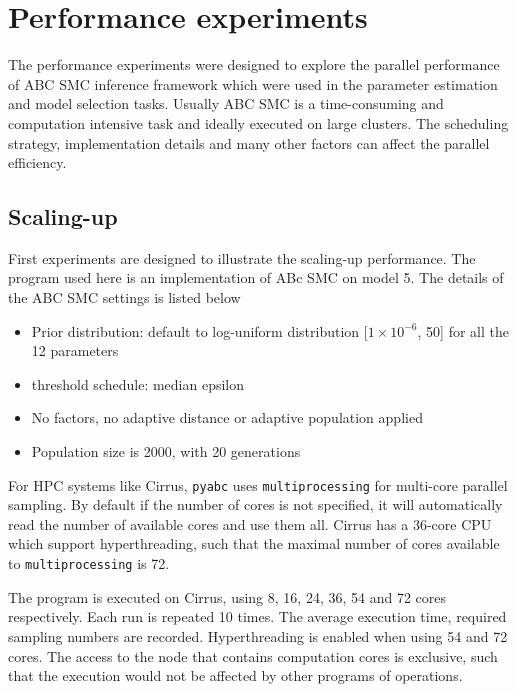 \chapter{Performance experiments}

The performance experiments were designed to explore the parallel performance of ABC SMC inference framework which were used in the parameter estimation and model selection tasks. Usually ABC SMC is a time-consuming and computation intensive task and ideally executed on large clusters. The scheduling strategy, implementation details and many other factors can affect the parallel efficiency.


\section{Scaling-up}

First experiments are designed to illustrate the scaling-up performance. The program used here is an implementation of ABc SMC on model 5. The details of the ABC SMC settings is listed below

\begin{itemize}
    \item Prior distribution: default to log-uniform distribution [$1\times 10^{-6}$, 50] for all the 12 parameters
    \item threshold schedule: median epsilon
    \item No factors, no adaptive distance or adaptive population applied
    \item Population size is 2000, with 20 generations
\end{itemize}


For HPC systems like Cirrus, \verb|pyabc| uses \verb|multiprocessing| for multi-core parallel sampling. By default if the number of cores is not specified, it will automatically read the number of available cores and use them all. Cirrus has a 36-core CPU which support hyperthreading, such that the maximal number of cores available to \verb|multiprocessing| is 72.

The program is executed on Cirrus, using 8, 16, 24, 36, 54 and 72 cores respectively. Each run is repeated 10 times. The average execution time, required sampling numbers are recorded. Hyperthreading is enabled when using 54 and 72 cores. The access to the node that contains computation cores is exclusive, such that the execution would not be affected by other programs of operations.

